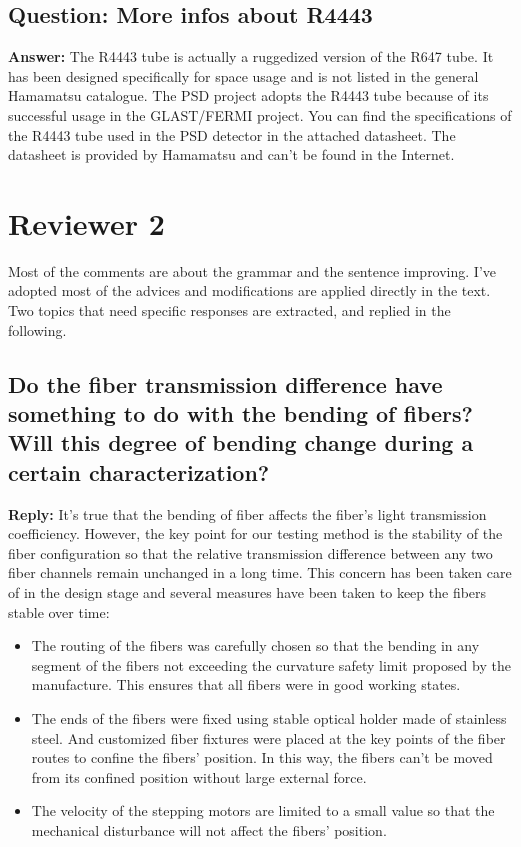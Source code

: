 \documentclass[]{article}
\begin{document}
\subsection{Question: More infos about R4443}

\textbf{Answer:}\newline
The R4443 tube is actually a ruggedized version of the R647 tube. It has been designed specifically for space usage and is not listed in the general Hamamatsu catalogue. The PSD project adopts the R4443 tube because of its successful usage in the GLAST/FERMI project. You can find the specifications of the R4443 tube used in the PSD detector in the attached datasheet. The datasheet is provided by  Hamamatsu and can't be found in the Internet. 

\section{Reviewer 2}

Most of the comments are about the grammar and the sentence improving. I've adopted most of the advices and modifications are applied directly in the text.
Two topics that need specific responses are extracted, and replied in the following.

\subsection{Do the fiber transmission difference have something to do with the bending of fibers?
Will this degree of bending change during a certain characterization?}

\textbf{Reply:}\newline
It's true that the bending of fiber affects the fiber's light transmission coefficiency. However, the key point for our testing method is the stability of the fiber configuration so that the relative transmission difference between any two fiber channels remain unchanged in a long time. This concern has been taken care of in the design stage and several measures have been taken to keep the fibers stable over time:
\begin{itemize}
	\item The routing of the fibers was carefully chosen so that the bending in any segment of the fibers not exceeding the curvature safety limit proposed by the manufacture. This ensures that all fibers were in good working states.
	\item The ends of the fibers were fixed using stable optical holder made of stainless steel. And customized fiber fixtures were placed at the key points of the fiber routes to confine the fibers' position. In this way, the fibers can't be moved from its confined position without large external force.
	\item The velocity of the stepping motors are limited to a small value so that the mechanical disturbance will not affect the fibers' position.
\end{itemize}
\end{document}
